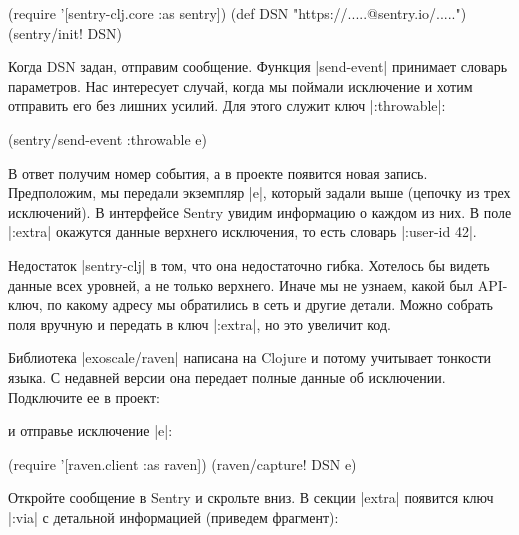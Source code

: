 \begin{english}
  \begin{clojure}
(require '[sentry-clj.core :as sentry])
(def DSN "https://.....@sentry.io/.....")
(sentry/init! DSN)
  \end{clojure}
\end{english}

Когда DSN задан, отправим сообщение. Функция \spverb|send-event| принимает
словарь параметров. Нас интересует случай, когда мы поймали исключение и хотим
отправить его без лишних усилий. Для этого служит ключ \spverb|:throwable|:

\begin{english}
  \begin{clojure}
(sentry/send-event {:throwable e})
  \end{clojure}
\end{english}

В ответ получим номер события, а в проекте появится новая запись. Предположим,
мы передали экземпляр \spverb|e|, который задали выше (цепочку из трех
исключений). В интерфейсе Sentry увидим информацию о каждом из них. В поле
\spverb|:extra| окажутся данные верхнего исключения, то есть словарь
\spverb|{:user-id 42}|.

Недостаток \spverb|sentry-clj| в том, что она недостаточно гибка. Хотелось бы
видеть данные всех уровней, а не только верхнего. Иначе мы не узнаем, какой был
API-ключ, по какому адресу мы обратились в сеть и другие детали. Можно собрать
поля вручную и передать в ключ \spverb|:extra|, но это увеличит код.

Библиотека \spverb|exoscale/raven| написана на Clojure и потому учитывает
тонкости языка. С недавней версии она передает полные данные об
исключении. Подключите ее в проект:

\begin{english}
  \begin{clojure}
  \end{clojure}
\end{english}

\noindent
и отправье исключение \spverb|e|:

\begin{english}
  \begin{clojure}
(require '[raven.client :as raven])
(raven/capture! DSN e)
  \end{clojure}
\end{english}

Откройте сообщение в Sentry и скрольте вниз. В секции \spverb|extra| появится
ключ \spverb|:via| с детальной информацией (приведем фрагмент):

